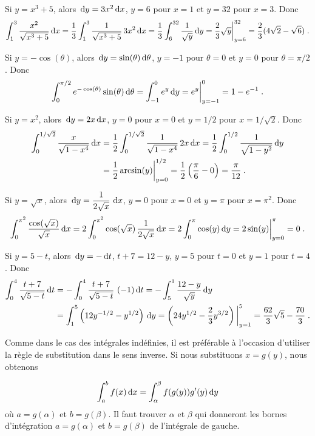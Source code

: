 {\begin{egg}
 Si $y = x^3+5$, alors $\,\mathrm{d}y = 3 x^2\,\mathrm{d}x$, $y=6$ pour
$x=1$ et $y=32$ pour $x=3$.  Donc
\[
\int_1^3 \frac{x^2}{\sqrt{x^3+5}}  \,\mathrm{d}x
= \frac{1}{3} \int_1^3 \frac{1}{\sqrt{x^3+5}}\,3 x^2 \,\mathrm{d}x
= \frac{1}{3} \int_6^{32} \frac{1}{\sqrt{y}} \,\mathrm{d}y
= \frac{2}{3} \sqrt{y} \bigg|_{y=6}^{32} = \frac{2}{3} ( 4\sqrt{2}-\sqrt{6} )
\; .
\]

 Si $y = -\cos(\theta)$, alors
$\,\mathrm{d}y = \sin(\theta)\,\mathrm{d}\theta$, $y=-1$ pour $\theta=0$ et
$y=0$ pour $\theta=\pi/2$.  Donc
\[
\int_0^{\pi/2} e^{-\cos(\theta)} \sin(\theta)\,\mathrm{d}\theta
= \int_{-1}^0 e^y \,\mathrm{d}y
= e^y \bigg|_{y=-1}^{0} = 1 - e^{-1} \; .
\]

 Si $y = x^2$, alors $\,\mathrm{d}y = 2x\,\mathrm{d}x$, 
$y=0$ pour $x=0$ et $y=1/2$ pour $x=1/\sqrt{2}$.  Donc
\begin{align*}
\int_0^{1/\sqrt{2}} \frac{x}{\sqrt{1-x^4}}  \,\mathrm{d}x
&= \frac{1}{2} \int_0^{1/\sqrt{2}} \frac{1}{\sqrt{1-x^4}}\,2x  \,\mathrm{d}x
= \frac{1}{2} \int_0^{1/2} \frac{1}{\sqrt{1-y^2}}\,\mathrm{d}y \\
&= \frac{1}{2} \arcsin(y) \bigg|_{y=0}^{1/2}
= \frac{1}{2} \left(\frac{\pi}{6} - 0\right) = \frac{\pi}{12} \; .
\end{align*}

 Si $y = \sqrt{x}$, alors
$\displaystyle \,\mathrm{d}y = \frac{1}{2\sqrt{x}}\,\,\mathrm{d}x$,
$y=0$ pour $x=0$ et $y=\pi$ pour $x=\pi^2$.  Donc
\[
\int_0^{\pi^2} \frac{\cos(\sqrt{x})}{\sqrt{x}} \,\mathrm{d}x
= 2\int_0^{\pi^2} \cos(\sqrt{x})\,\frac{1}{2\sqrt{x}} \,\mathrm{d}x
= 2\int_0^{\pi} \cos(y)\,\mathrm{d}y
=  2\sin(y)\bigg|_{y=0}^{\pi} = 0 \; .
\]

 Si $y = 5-t$, alors $\,\mathrm{d}y = -\,\mathrm{d}t$, $t+7 = 12 -y$,
$y=5$ pour $t=0$ et $y=1$ pour $t=4$.  Donc
\begin{align*}
\int_0^4 \frac{t+7}{\sqrt{5-t}}  \,\mathrm{d}t
&= - \int_0^4 \frac{t+7}{\sqrt{5-t}} \ (-1)  \,\mathrm{d}t
= -\int_5^1 \frac{12-y}{\sqrt{y}}  \,\mathrm{d}y \\
&= \int_1^5 \left( 12 y^{-1/2} - y^{1/2} \right)  \,\mathrm{d}y
= \left( 24 y^{1/2} - \frac{2}{3} y^{3/2} \right) \bigg|_{y=1}^5
= \frac{62}{3} \sqrt{5}  - \frac{70}{3} \; .
\end{align*}
\end{egg}

\begin{rmk}[\eng]
Comme dans le cas des intégrales indéfinies, il est préférable à
l'occasion d'utiliser la règle de substitution dans le sens inverse.
Si nous substituons $x=g(y)$, nous obtenons

\[
\int_a^b f(x) \,\mathrm{d}x = \int_\alpha^\beta f(g(y))g'(y) \,\mathrm{d}y
\]
où $a = g(\alpha)$ et $b = g(\beta)$.  Il faut trouver $\alpha$ et
$\beta$ qui donneront les bornes d'intégration 
$a = g(\alpha)$ et $b = g(\beta)$ de l'intégrale de gauche.
\end{rmk}

}
